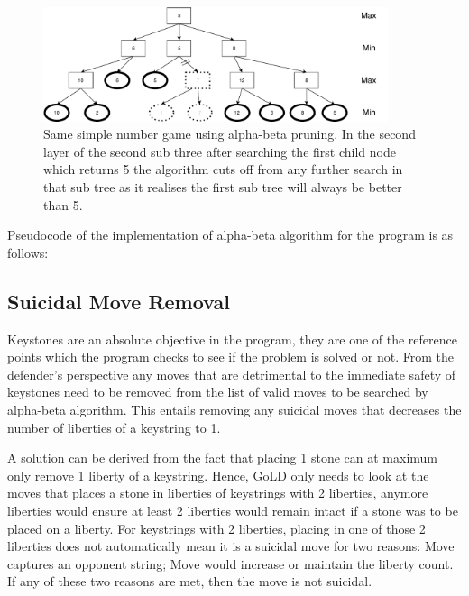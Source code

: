 \documentclass{l4proj}
\begin{document}
\begin{figure}[!h]
\centering
\includegraphics[width=0.9\textwidth]{ABNumTree}
\caption{Same simple number game using alpha-beta pruning. In the second layer of the second sub three after searching the first child node which returns 5 the algorithm cuts off from any further search in that sub tree as it realises the first sub tree will always be better than 5. }
\label{fig:ABNumTree}
\end{figure}

Pseudocode of the implementation of alpha-beta algorithm for the program is as follows:







\subsection{Suicidal Move Removal}
Keystones are an absolute objective in the program, they are one of the reference points which the program checks to see if the problem is solved or not. From the defender’s perspective any moves that are detrimental to the immediate safety of keystones need to be removed from the list of valid moves to be searched by alpha-beta algorithm. This entails removing any suicidal moves that decreases the number of liberties of a keystring to 1.

A solution can be derived from the fact that placing 1 stone can at maximum only remove 1 liberty of a keystring. Hence, GoLD only needs to look at the moves that places a stone in liberties of keystrings with 2 liberties, anymore liberties would ensure at least 2 liberties would remain intact if a stone was to be placed on a liberty. For keystrings with 2 liberties, placing in one of those 2 liberties does not automatically mean it is a suicidal move for two reasons: Move captures an opponent string; Move would increase or maintain the liberty count. If any of these two reasons are met, then the move is not suicidal.
\end{document}
